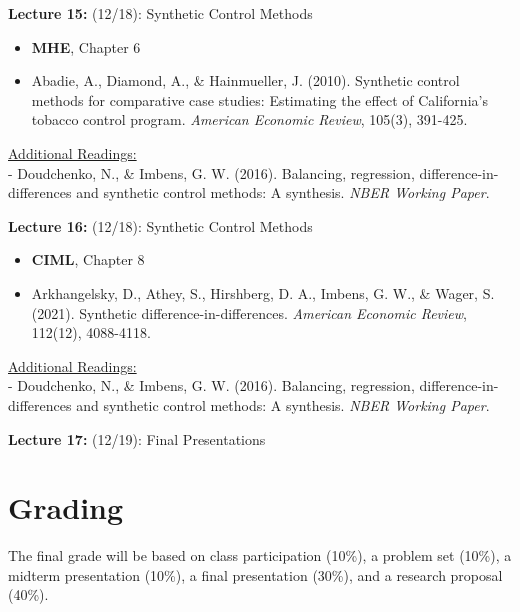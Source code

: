 \documentclass[12pt]{article}
\begin{document}
\vspace{2em}
\noindent\textbf{Lecture 15:} (12/18): Synthetic Control Methods \\
\vspace{1em}
\begin{itemize}
    \item \textbf{MHE}, Chapter 6
    \item Abadie, A., Diamond, A., \& Hainmueller, J. (2010). Synthetic control methods for comparative case studies: Estimating the effect of California's tobacco control program. \textit{American Economic Review}, 105(3), 391-425.
\end{itemize}
\vspace{1em}
\underline{Additional Readings:} \\
\hspace{1em} - Doudchenko, N., \& Imbens, G. W. (2016). Balancing, regression, difference-in-differences and synthetic control methods: A synthesis. \textit{NBER Working Paper}.

\vspace{2em}
\noindent\textbf{Lecture 16:} (12/18): Synthetic Control Methods  \\
\vspace{1em}
\begin{itemize}
    \item \textbf{CIML}, Chapter 8
    \item Arkhangelsky, D., Athey, S., Hirshberg, D. A., Imbens, G. W., \& Wager, S. (2021). Synthetic difference-in-differences. \textit{American Economic Review}, 112(12), 4088-4118.
\end{itemize}
\vspace{1em}
\underline{Additional Readings:} \\
\hspace{1em} - Doudchenko, N., \& Imbens, G. W. (2016). Balancing, regression, difference-in-differences and synthetic control methods: A synthesis. \textit{NBER Working Paper}.

\vspace{2em}
\noindent\textbf{Lecture 17:} (12/19): Final Presentations \\

\section*{Grading}
The final grade will be based on class participation (10\%), a problem set (10\%), a midterm presentation (10\%), a final presentation (30\%), and a research proposal (40\%). 
\end{document}
